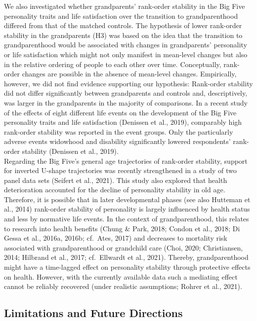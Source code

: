 \documentclass[
  english,
  man, noextraspace]{apa7}
\begin{document}
We also investigated whether grandparents' rank-order stability in the Big Five personality traits and life satisfaction over the transition to grandparenthood differed from that of the matched controls. The hypothesis of lower rank-order stability in the grandparents (H3) was based on the idea that the transition to grandparenthood would be associated with changes in grandparents' personality or life satisfaction which might not only manifest in mean-level changes but also in the relative ordering of people to each other over time. Conceptually, rank-order changes are possible in the absence of mean-level changes. Empirically, however, we did not find evidence supporting our hypothesis: Rank-order stability did not differ significantly between grandparents and controls and, descriptively, was larger in the grandparents in the majority of comparisons. In a recent study of the effects of eight different life events on the development of the Big Five personality traits and life satisfaction (Denissen et al., 2019), comparably high rank-order stability was reported in the event groups. Only the particularly adverse events widowhood and disability significantly lowered respondents' rank-order stability (Denissen et al., 2019).\\
Regarding the Big Five's general age trajectories of rank-order stability, support for inverted U-shape trajectories was recently strengthened in a study of two panel data sets (Seifert et al., 2021). This study also explored that health deterioration accounted for the decline of personality stability in old age. Therefore, it is possible that in later developmental phases (see also Hutteman et al., 2014) rank-order stability of personality is largely influenced by health status and less by normative life events. In the context of grandparenthood, this relates to research into health benefits (Chung \& Park, 2018; Condon et al., 2018; Di Gessa et al., 2016a, 2016b; cf.~Ates, 2017) and decreases to mortality risk associated with grandparenthood or grandchild care (Choi, 2020; Christiansen, 2014; Hilbrand et al., 2017; cf.~Ellwardt et al., 2021). Thereby, grandparenthood might have a time-lagged effect on personality stability through protective effects on health. However, with the currently available data such a mediating effect cannot be reliably recovered (under realistic assumptions; Rohrer et al., 2021).

\hypertarget{limitations-and-future-directions}{%
\subsection{Limitations and Future Directions}\label{limitations-and-future-directions}}
\end{document}

